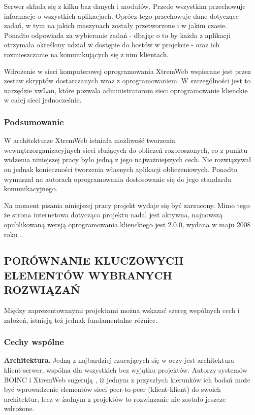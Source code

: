 \documentclass[12pt,a4paper,twoside]{article}
\begin{document}
Serwer składa się z kilku baz danych i modułów. Przede wszystkim przechowuje informacje o wszystkich aplikacjach. Oprócz tego przechowuje dane dotyczące zadań, w tym na jakich maszynach zostały przetworzone i w jakim czasie. Ponadto odpowiada za wybieranie zadań - dbając o to by każda z aplikacji otrzymała określony udział w dostępie do hostów w projekcie - oraz ich rozmieszczanie na komunikujących się z nim klientach.

Wdrożenie w sieci komputerowej oprogramowania XtremWeb wspierane jest przez zestaw skryptów dostarczanych wraz z oprogramowaniem. W szczególności jest to narzędzie xwLan, które pozwala administratorom sieci oprogramowanie klienckie w całej sieci jednocześnie.

\subsubsection{Podsumowanie}

W architekturze XtremWeb istniała możliwość tworzenia wewnątrzorganizacyjnych sieci służących do obliczeń rozproszonych, co z punktu widzenia niniejszej pracy było jedną z jego najważniejszych cech. Nie rozwiązywał on jednak konieczności tworzenia własnych aplikacji obliczeniowych. Ponadto wymuszał na autorach oprogramowania dostosowanie się do jego standardu komunikacyjnego.

Na moment pisania niniejszej pracy projekt wydaje się być zarzucony. Mimo tego że strona internetowa dotycząca projektu nadal jest aktywna, najnowszą opublikowaną wersją oprogramowania klienckiego jest 2.0.0, wydana w maju 2008 roku \cite{xtremwebforge}.

\subsection{PORÓWNANIE KLUCZOWYCH ELEMENTÓW WYBRANYCH ROZWIĄZAŃ}

Między zaprezentowanymi projektami można wskazać szereg wspólnych cech i założeń, istnieją też jednak fundamentalne różnice.

\subsubsection{Cechy wspólne}

\textbf{Architektura}. Jedną z najbardziej rzucających się w oczy jest architektura klient-serwer, wspólna dla wszystkich bez wyjątku projektów. Autorzy systemów BOINC i XtremWeb sugerują \cite{boinc,xtremweb}, iż jednym z przyszłych kierunków ich badań może być wprowadzenie elementów sieci peer-to-peer (klient-klient) do swoich architektur, lecz w żadnym z projektów to rozwiązanie nie zostało jeszcze wdrożone.
\end{document}
